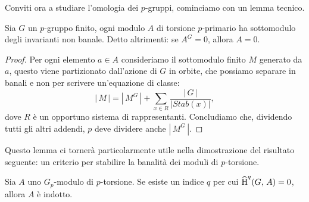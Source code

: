 Conviti ora a studiare l'omologia dei $ p $-gruppi, 
cominciamo con un lemma tecnico.

\begin{lemma}\label{ban1}
	Sia $ G $ un $ p $-gruppo finito, ogni modulo $ A $ di torsione $ p $-primario ha sottomodulo degli invarianti non banale. Detto altrimenti: se $ A^G = 0 $, allora $ A = 0 $.
\end{lemma}
\begin{proof}
	Per ogni elemento $ a \in A $ consideriamo il sottomodulo finito $ M $ generato da $ a $, questo viene partizionato dall'azione di $ G $ in orbite, che possiamo separare in banali e non per scrivere un'equazione di classe:
	\[ |\,M\,| = |\, M^G\,| +\sum_{x \in R} \frac{|\,G\,|}{|Stab(x)|},  \]
	dove $ R $ è un opportuno sistema di rappresentanti. Concludiamo che, dividendo tutti gli altri addendi, $ p $ deve dividere anche $ |\, M^G \, | $.
\end{proof}

Questo lemma ci tornerà particolarmente utile nella dimostrazione del risultato seguente: un criterio per stabilire la banalità dei moduli di $ p $-torsione.

\begin{proposition} \label{ban2}
	Sia $ A $ uno $ G_p $-modulo di $ p $-torsione. Se esiste un indice $ q $ per cui $ \operatorname{\widehat{H}}^q(G, \, A) = 0 $, allora $ A $ è indotto.
\end{proposition}

